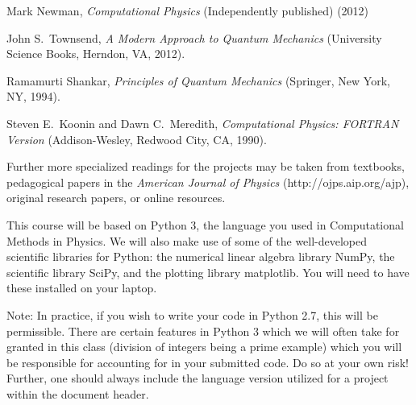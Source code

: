 \documentclass[12pt]{mcplain}
\begin{document}
\begin{leftindentlist*}{\baselineskip}

  \item Mark Newman, \textit{Computational Physics} (Independently published) (2012)

  \item John S.~Townsend, \textit{A Modern Approach to Quantum Mechanics} (University
  Science Books, Herndon, VA, 2012).

  \item Ramamurti Shankar, \textit{Principles of Quantum Mechanics} (Springer,
  New York, NY, 1994).

  \item Steven E.~Koonin and Dawn C.~Meredith, \textit{Computational
  Physics: FORTRAN Version} (Addison-Wesley, Redwood City, CA, 1990).
\end{leftindentlist*}


Further more specialized readings for the projects may be taken from
textbooks, pedagogical papers in the \textit{American Journal of
Physics} (http://ojps.aip.org/ajp), original research papers, or
online resources.


This course will be based on Python 3, the language you used in Computational
Methods in Physics. We will also make use of some of the well-developed
scientific libraries for Python: the numerical linear algebra library NumPy, the
scientific library SciPy, and the plotting library matplotlib. You will need
to have these installed on your laptop.

Note: In practice, if you wish to write your code in Python 2.7, this will be permissible. There are certain features in Python 3 which we will often take for granted in this class (division of integers being a prime example) which you will be responsible for accounting for in your submitted code. Do so at your own risk! Further, one should always include the language version utilized for a project within the document header.

\end{document}
